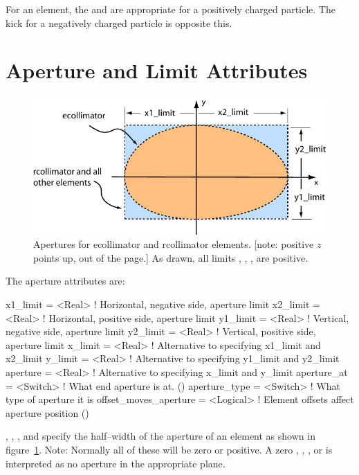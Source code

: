 For an  element, the  and  are appropriate for a positively
charged particle. The kick for a negatively charged particle is opposite this.

\section{Aperture and Limit Attributes}
\label{s:limit}

\begin{figure}[ht]
  \centering
  \includegraphics{apertures.pdf}
  \caption[Apertures for ecollimator and rcollimator elements.]
  {Apertures for ecollimator and rcollimator elements. 
  [note: positive $z$ points up, out of the page.] 
  As drawn, all limits , , 
  ,  are  positive.}  
  \label{f:limit}
\end{figure}

The aperture attributes are:
\begin{example}
  x1_limit      = <Real>      ! Horizontal, negative side, aperture limit
  x2_limit      = <Real>      ! Horizontal, positive side, aperture limit
  y1_limit      = <Real>      ! Vertical, negative side, aperture limit
  y2_limit      = <Real>      ! Vertical, positive side, aperture limit
  x_limit       = <Real>      ! Alternative to specifying x1_limit and x2_limit
  y_limit       = <Real>      ! Alternative to specifying y1_limit and y2_limit
  aperture      = <Real>      ! Alternative to specifying x_limit and y_limit
  aperture_at   = <Switch>    ! What end aperture is at. ()
  aperture_type = <Switch>    ! What type of aperture it is
  offset_moves_aperture = <Logical> ! Element offsets affect aperture position ()
\end{example}
, , , and  specify the half--width of the
aperture of an element as shown in figure~\ref{f:limit}. Note: Normally all of these will be zero or
positive. A zero , , , or  is interpreted as no
aperture in the appropriate plane.

